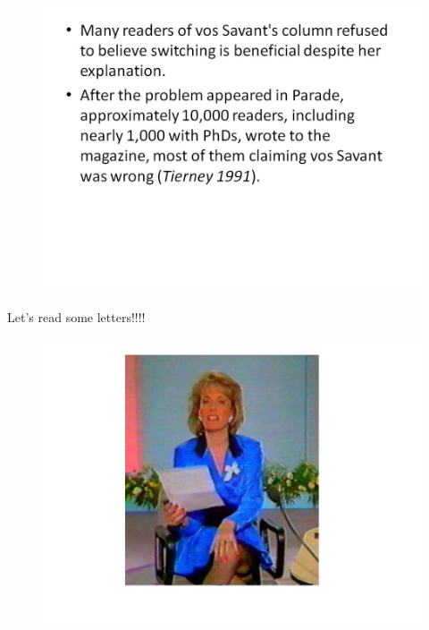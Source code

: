 \documentclass{beamer}
\begin{document}
\begin{frame}
	\begin{figure}
		\centering
		\includegraphics[width=1.1\linewidth]{MontyHall/Slide6}
		
	\end{figure}
	
\end{frame}

\begin{frame}
	
	Let's read some letters!!!!
	\begin{figure}
		\centering
		\includegraphics[width=0.9\linewidth]{MontyHall/Slide7}
		\end{figure}
	
\end{frame}
\end{document}
